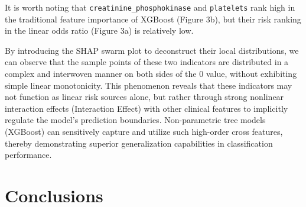 \documentclass[11pt,a4paper]{article}
\begin{document}
\begin{enumerate}
    It is worth noting that \texttt{creatinine\_phosphokinase} and \texttt{platelets} rank high in the traditional feature importance of XGBoost (Figure 3b), but their risk ranking in the linear odds ratio (Figure 3a) is relatively low.
    
    By introducing the SHAP swarm plot to deconstruct their local distributions, we can observe that the sample points of these two indicators are distributed in a complex and interwoven manner on both sides of the $0$ value, without exhibiting simple linear monotonicity. This phenomenon reveals that these indicators may not function as linear risk sources alone, but rather through strong nonlinear interaction effects (Interaction Effect) with other clinical features to implicitly regulate the model's prediction boundaries. Non-parametric tree models (XGBoost) can sensitively capture and utilize such high-order cross features, thereby demonstrating superior generalization capabilities in classification performance.
\end{enumerate}

\section{Conclusions}
\end{document}
